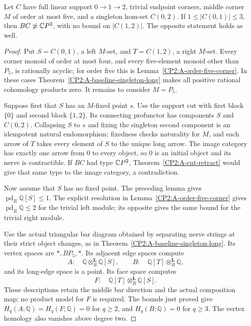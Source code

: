 \begin{theorem}
\label{CP2:A-five-middle-three-stalk-singleton-long}
Let $C$ have full linear support $0\to1\to2$, trivial endpoint
corners, middle corner $M$ of order at most five, and a singleton
hom-set $C(0,2)$. If $1\leq |C(0,1)|\leq3$, then
$BC\not\simeq\mathbb{C}P^2$, with no bound on $|C(1,2)|$.
The opposite statement holds as well.
\end{theorem}
\begin{proof}
Put $S=C(0,1)$, a left $M$-set, and $T=C(1,2)$, a right
$M$-set. Every corner monoid of order at most four, and every
five-element monoid other than $P_5$, is rationally acyclic;
for order five this is Lemma~\ref{CP2:A-order-five-corner}.
In these cases Theorem~\ref{CP2:A-baseline-singleton-long}
makes all positive rational cohomology products zero.
It remains to consider $M=P_5$.

Suppose first that $S$ has an $M$-fixed point $s$. Use the
support cut with first block $\{0\}$ and second block
$\{1,2\}$. Its connecting profunctor has components $S$ and
$C(0,2)$. Collapsing $S$ to $s$ and fixing the singleton second
component is an idempotent natural endomorphism: fixedness
checks naturality for $M$, and each arrow of $T$ takes every
element of $S$ to the unique long arrow. The image category
has exactly one arrow from $0$ to every object, so $0$ is an
initial object and its nerve is contractible. If $BC$ had type
$\mathbb{C}P^2$, Theorem~\ref{CP2:A-cut-retract} would give that same
type to the image category, a contradiction.

Now assume that $S$ has no fixed point. The preceding lemma
gives $\operatorname{pd}_R\mathbb Q[S]\leq1$. The explicit
resolution in Lemma~\ref{CP2:A-order-five-corner} gives
$\operatorname{pd}_R\mathbb Q\leq2$ for the trivial left
module; its opposite gives the same bound for the trivial
right module.

Use the actual triangular bar diagram obtained by separating
nerve strings at their strict object changes, as in
Theorem~\ref{CP2:A-baseline-singleton-long}. Its vertex spaces
are $*,BP_5,*$. Its adjacent edge spaces compute
\[
 A:\quad \mathbb Q\otimes_R^{\mathbf L}\mathbb Q[S],
 \qquad
 B:\quad \mathbb Q[T]\otimes_R^{\mathbf L}\mathbb Q,
\]
and its long-edge space is a point. Its face space computes
\[
 F:\quad \mathbb Q[T]\otimes_R^{\mathbf L}\mathbb Q[S].
\]
These descriptions retain the middle bar direction and the
actual composition map; no product model for $F$ is required.
The bounds just proved give $H_q(A;\mathbb Q)=H_q(F;\mathbb Q)=0$
for $q\geq2$, and $H_q(B;\mathbb Q)=0$ for $q\geq3$.
The vertex homology also vanishes above degree two.


\end{proof}
